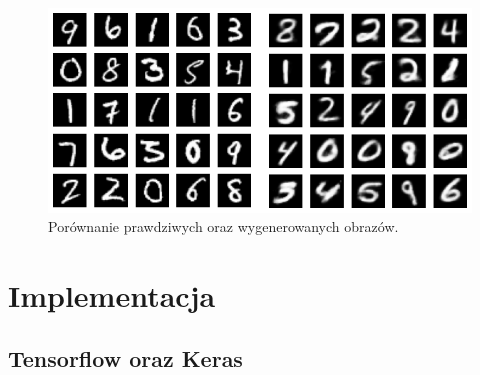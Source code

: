 \documentclass[a4paper,12pt]{book} %
\begin{document}
\begin{figure}[h!]
	\centering
	\includegraphics[width=12cm]{vaegeneracja.png}
	\caption{Porównanie prawdziwych oraz wygenerowanych obrazów.}
	\label{fig:vaegeneracja}
\end{figure}


\chapter{Implementacja}
\section{Tensorflow oraz Keras}
\lipsum[1]\cite{doersch2021tutorial}


\listoffigures{} %



\end{document}
